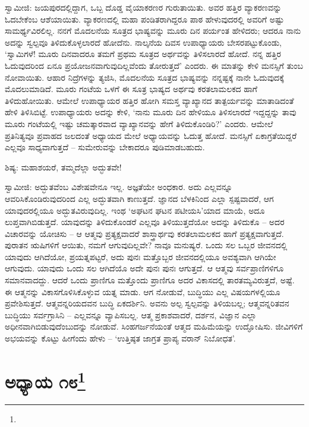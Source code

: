 ಸ್ವಾಮೀಜಿ: ಜಯಪುರದಲ್ಲಿದ್ದಾಗ, ಒಬ್ಬ ದೊಡ್ಡ ವೈಯಾಕರಣರ ಗುರುತಾಯಿತು. ಅವರ ಹತ್ತಿರ ವ್ಯಾಕರಣವನ್ನು ಓದಬೇಕೆಂಬ ಆಶೆಯಾಯಿತು. ವ್ಯಾಕರಣದಲ್ಲಿ ಮಹಾ ಪಂಡಿತರಾಗಿದ್ದರೂ ಪಾಠ ಹೇಳುವುದರಲ್ಲಿ ಅವರಿಗೆ ಅಷ್ಟು ಸಾಮರ್ಥ್ಯವಿರಲಿಲ್ಲ. ನನಗೆ ಮೊದಲನೆಯ ಸೂತ್ರದ ಭಾಷ್ಯವನ್ನು ಮೂರು ದಿನ ಪರ್ಯಂತ ಹೇಳಿದರು; ಆದರೂ ನಾನು ಅದನ್ನು ಸ್ವಲ್ಪವೂ ತಿಳಿದುಕೊಳ್ಳಲಾರದೆ ಹೋದೆನು. ನಾಲ್ಕನೆಯ ದಿವಸ ಉಪಾಧ್ಯಾಯರು ಬೇಸರಪಟ್ಟುಕೊಂಡು, ‘ಸ್ವಾಮಿಗಳೆ! ಮೂರು ದಿನವಾದರೂ ತಮಗೆ ಪ್ರಥಮ ಸೂತ್ರದ ಅರ್ಥವನ್ನು ತಿಳಿಸಲಾರದೆ ಹೋದೆ. ನನ್ನ ಹತ್ತಿರ ಓದುವುದರಿಂದ ಏನೂ ಪ್ರಯೋಜನವಾಗುವುದಿಲ್ಲವೆಂದು ತೋರುತ್ತದೆ’ ಎಂದರು. ಈ ಮಾತನ್ನು ಕೇಳಿ ಮನಸ್ಸಿಗೆ ತುಂಬ ನೋವಾಯಿತು. ಆಹಾರ ನಿದ್ರೆಗಳನ್ನು ತ್ಯಜಿಸಿ, ಮೊದಲನೆಯ ಸೂತ್ರದ ಭಾಷ್ಯವನ್ನು ನನ್ನಷ್ಟಕ್ಕೆ ನಾನೇ ಓದುವುದಕ್ಕೆ ಮೊದಲುಮಾಡಿದೆ. ಮೂರು ಗಂಟೆಯ ಒಳಗೆ ಈ ಸೂತ್ರ ಭಾಷ್ಯದ ಅರ್ಥವು ಕರತಲಾಮಲಕದ ಹಾಗೆ ತಿಳಿದುಹೋಯಿತು. ಆಮೇಲೆ ಉಪಾಧ್ಯಾಯರ ಹತ್ತಿರ ಹೋಗಿ ಸಮಸ್ತ ವ್ಯಾಖ್ಯಾನದ ತಾತ್ಪರ್ಯವನ್ನು ಮಾತಾಡಿದಂತೆ ಹೇಳಿ ತಿಳಿಸಿಬಿಟ್ಟೆ. ಉಪಾಧ್ಯಾಯರು ಅದನ್ನು ಕೇಳಿ, ‘ನಾನು ಮೂರು ದಿನ ಹೇಳಿಯೂ ತಿಳಿಸಲಾರದೆ ಇದ್ದದ್ದನ್ನು ತಾವು ಮೂರು ಗಂಟೆಯಲ್ಲಿ ಇಷ್ಟು ಚಮತ್ಕಾರವಾದ ವ್ಯಾಖ್ಯಾನವನ್ನು ಹೇಗೆ ತಿಳಿದುಕೊಂಡಿರಿ?’ ಎಂದರು. ಆಮೇಲೆ ಪ್ರತಿನಿತ್ಯವೂ ಪ್ರವಾಹದ ಜಲದಂತೆ ಅಧ್ಯಾಯದ ಮೇಲೆ ಅಧ್ಯಾಯವನ್ನು ಓದುತ್ತ ಹೋದೆ. ಮನಸ್ಸಿಗೆ ಏಕಾಗ್ರತೆಯಿದ್ದರೆ ಎಲ್ಲವೂ ಸಾಧ್ಯವಾಗುತ್ತದೆ – ಸುಮೇರುವನ್ನು ಬೇಕಾದರೂ ಪುಡಿಮಾಡಬಹುದು.

ಶಿಷ್ಯ: ಮಹಾಶಯರೆ, ತಮ್ಮದೆಲ್ಲಾ ಅದ್ಭುತವೇ!

ಸ್ವಾಮೀಜಿ: ಅದ್ಭುತವೆಂಬ ವಿಶೇಷವೇನೂ ಇಲ್ಲ. ಅಜ್ಞತೆಯೇ ಅಂಧಕಾರ. ಅದು ಎಲ್ಲವನ್ನೂ ಆವರಿಸಿಕೊಂಡಿರುವುದರಿಂದ ಎಲ್ಲ ಅದ್ಭುತವಾಗಿ ಕಾಣುತ್ತದೆ. ಜ್ಞಾನದ ಬೆಳಕಿನಿಂದ ಎಲ್ಲಾ ಸ್ಪಷ್ಟವಾದರೆ, ಆಗ ಯಾವುದರಲ್ಲಿಯೂ ಅದ್ಭುತವಿರುವುದಿಲ್ಲ. ಇಂಥ ‘ಅಘಟನ ಘಟನ ಪಟೀಯಸಿ’ಯಾದ ಮಾಯೆ, ಅದೂ ಲುಪ್ತವಾಗಿಬಿಡುತ್ತದೆ. ಯಾವುದನ್ನು ತಿಳಿದುಕೊಂಡರೆ ಎಲ್ಲವೂ ತಿಳಿಯುತ್ತದೆಯೋ ಅದನ್ನು ತಿಳಿದುಕೊ – ಅದರ ವಿಚಾರವನ್ನು ಯೋಚಿಸು – ಆ ಆತ್ಮವು ಪ್ರತ್ಯಕ್ಷವಾದರೆ ಶಾಸ್ತ್ರಾರ್ಥವು ಕರತಲಾಮಲಕದ ಹಾಗೆ ಪ್ರತ್ಯಕ್ಷವಾಗುತ್ತದೆ. ಪುರಾತನ ಋಷಿಗಳಿಗೆ ಆಯಿತು, ನಮಗೆ ಆಗುವುದಿಲ್ಲವೇ? ನಾವೂ ಮನುಷ್ಯರೆ. ಒಂದು ಸಲ ಒಬ್ಬರ ಜೀವನದಲ್ಲಿ ಯಾವುದು ಆಗಿದೆಯೋ, ಪ್ರಯತ್ನಪಟ್ಟರೆ, ಅದು ಪುನಃ ಮತ್ತೊಬ್ಬರ ಜೀವನದಲ್ಲಿಯೂ ಅವಶ್ಯವಾಗಿ ಆಗಿಯೇ ಆಗುವುದು. ಯಾವುದು ಒಂದು ಸಲ ಆಗಿದೆಯೊ ಅದೇ ಪುನಃ ಪುನಃ ಆಗುತ್ತದೆ. ಆ ಆತ್ಮವು ಸರ್ವಪ್ರಾಣಿಗಳಿಗೂ ಸಮಾನವಾದದ್ದು. ಆದರೆ ಒಂದು ಪ್ರಾಣಿಗೂ ಮತ್ತೊಂದು ಪ್ರಾಣಿಗೂ ಅದರ ವಿಕಾಸದಲ್ಲಿ ತಾರತಮ್ಯವಿರುತ್ತದೆ, ಅಷ್ಟೆ. ಈ ಆತ್ಮನನ್ನು ವಿಕಾಸಗೊಳಿಸಿಕೊಳ್ಳುವ ಯತ್ನ ಮಾಡು. ಆಗ ನೋಡುವೆ, ಬುದ್ಧಿಯು ಎಲ್ಲ ವಿಷಯಗಳಲ್ಲಿಯೂ ಪ್ರವೇಶಿಸುತ್ತದೆ. ಆತ್ಮವನ್ನರಿಯದವನ ಬುದ್ಧಿ ಏಕದರ್ಶಿನಿ. ಅವನು ಅಲ್ಪ ಸ್ವಲ್ಪವನ್ನು ತಿಳಿಯಬಲ್ಲ; ಆತ್ಮವನ್ನರಿತವನ ಬುದ್ಧಿಯು ಸರ್ವಗ್ರಾಸಿನಿ – ಎಲ್ಲವನ್ನೂ ವ್ಯಾಪಿಸಬಲ್ಲ. ಆತ್ಮ ಪ್ರಕಾಶವಾದರೆ, ದರ್ಶನ, ವಿಜ್ಞಾನ ಎಲ್ಲಾ ಅಧೀನವಾಗಿಬಿಡುವುದೆಂಬುದನ್ನು ನೋಡುವೆ. ಸಿಂಹಗರ್ಜನೆಯಂತೆ ಆತ್ಮದ ಮಹಿಮೆಯನ್ನು ಉದ್ಘೋಷಿಸು. ಜೀವಿಗಳಿಗೆ ಅಭಯವನ್ನು ಕೊಟ್ಟು ಹೀಗೆಂದು ಹೇಳು – ‘ಉತ್ತಿಷ್ಠತ ಜಾಗ್ರತ ಪ್ರಾಪ್ಯ ವರಾನ್ ನಿಬೋಧತ’.

\newpage

\chapter[ಅಧ್ಯಾಯ ೧೮]{ಅಧ್ಯಾಯ ೧೮\protect\footnote{}}

